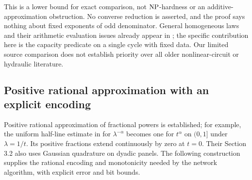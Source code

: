 This is a lower bound for exact comparison, not $\mathrm{NP}$-hardness or an
additive-approximation obstruction. No converse reduction is asserted,
and the proof says nothing about fixed exponents of odd denominator.
General homogeneous laws and their arithmetic evaluation issues already
appear in \citet[Section 2.1, May 2018 manuscript]{gro2017-algorithmic-results-for-potential-based};
the specific contribution here is the capacity predicate on a single
cycle with fixed data. Our limited source comparison does not establish
priority over all older nonlinear-circuit or hydraulic literature.

\subsection{Positive rational approximation with an explicit encoding}
\label{subsec:a-law-rational}
Positive rational approximation of fractional powers is established;
for example, the uniform half-line estimate in
\citet[Section 3.3, equation (37), Lemma 3.4, and Remark 3.1,
arXiv version]{bonito2015-numerical-approximation-of-fractional-powers}
for $\lambda^{-\alpha}$ becomes one for $t^\alpha$ on $(0,1]$ under
$\lambda=1/t$. Its positive fractions extend continuously by zero at
$t=0$. Their Section 3.2 also uses Gaussian quadrature on dyadic panels.
The following construction supplies the rational encoding and
monotonicity needed by the network algorithm, with explicit error and
bit bounds.

